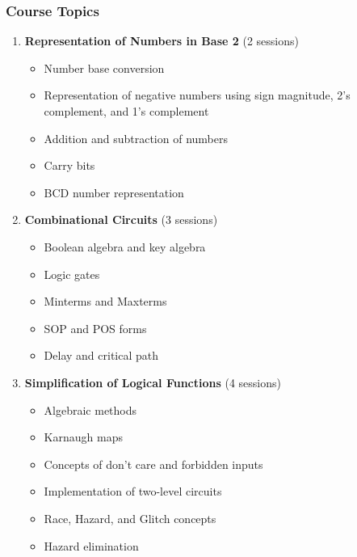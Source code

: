 \documentclass[12pt]{article}
\begin{document}
\subsubsection*{Course Topics}
\begin{enumerate}
    \item \textbf{Representation of Numbers in Base 2} (2 sessions)
        \begin{itemize}
            \item Number base conversion
            \item Representation of negative numbers using sign magnitude, 2's complement, and 1's complement
            \item Addition and subtraction of numbers
            \item Carry bits
            \item BCD number representation
        \end{itemize}
    
    \item \textbf{Combinational Circuits} (3 sessions)
        \begin{itemize}
            \item Boolean algebra and key algebra
            \item Logic gates
            \item Minterms and Maxterms
            \item SOP and POS forms
            \item Delay and critical path
        \end{itemize}
    
    \item \textbf{Simplification of Logical Functions} (4 sessions)
        \begin{itemize}
            \item Algebraic methods
            \item Karnaugh maps
            \item Concepts of don't care and forbidden inputs
            \item Implementation of two-level circuits
            \item Race, Hazard, and Glitch concepts
            \item Hazard elimination
        \end{itemize}


\end{enumerate}
\end{document}
